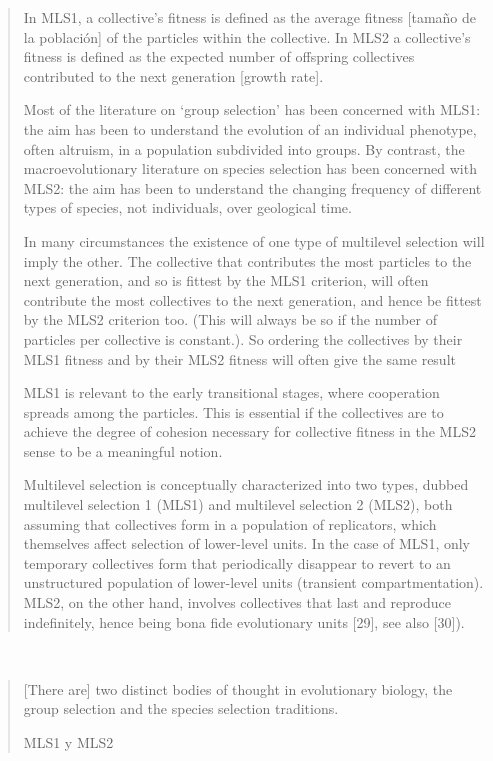 \documentclass[a4paper,10pt]{article}
\begin{document}
\begin{quotation}
    In MLS1, a collective’s fitness is defined as the average fitness [tamaño de la población] of the particles within the collective.
    In MLS2 a collective’s fitness is defined as the expected number of offspring collectives contributed to the next generation [growth rate].
    
    Most of the literature on ‘group selection’ has been concerned with MLS1: the aim has been to understand the evolution of an individual phenotype, often altruism, in a population subdivided into groups.
    By contrast, the macroevolutionary literature on species selection has been concerned with MLS2: the aim has been to understand the changing frequency of different types of species, not individuals, over geological time.
    
    In many circumstances the existence of one type of multilevel selection will imply the other.
    The collective that contributes the most particles to the next generation, and so is fittest by the MLS1 criterion, will often contribute the most collectives to the next generation, and hence be fittest by the MLS2 criterion too.
    (This will always be so if the number of particles per collective is constant.).
    So ordering the collectives by their MLS1 fitness and by their MLS2 fitness will often give the same result
    
    MLS1 is relevant to the early transitional stages, where cooperation spreads among the particles.
    This is essential if the collectives are to achieve the degree of cohesion necessary for collective fitness in the MLS2 sense to be a meaningful notion.
    
    Multilevel selection is conceptually characterized into two types, dubbed multilevel selection 1 (MLS1) and multilevel selection 2 (MLS2), both assuming that collectives form in a population of replicators, which themselves affect selection of lower-level units.
    In the case of MLS1, only temporary collectives form that periodically disappear to revert to an unstructured population of lower-level units (transient compartmentation).
    MLS2, on the other hand, involves collectives that last and reproduce indefinitely, hence being bona fide evolutionary units [29], see also [30]).
    
\end{quotation}

\\

\begin{quotation} \cite{damuth1988-multilevelSelection}
    [There are] two distinct bodies of thought in evolutionary biology, the group selection and the species selection traditions.

MLS1 y MLS2
\end{quotation}
\end{document}
